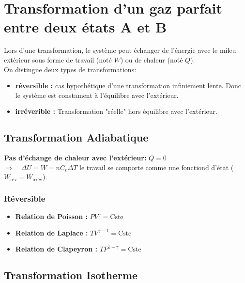 \documentclass[a4paper,12pt]{article}
\newcommand{\re}{\textrm}
\newcommand{\Cv}{\overline{C}_v} %
\begin{document}
\clearpage

\section{Transformation d'un gaz parfait entre deux états A et B}

    Lors d'une transformation, le système peut échanger de l'énergie avec le mileu extérieur
    sous forme de travail (noté $W$) ou de chaleur (noté $Q$).\\
    On distingue deux types de transformations:
    \begin{itemize}
        \item \textbf{réversible :} cas hypothétique d'une transformation infiniement lente. Donc le système est constament à l'équilibre avec l'extérieur.
        \item \textbf{irréverible :} Transformation "réelle" hors équilibre avec l'extérieur.
    \end{itemize}


    \subsection{Transformation Adiabatique}

        \textbf{Pas d'échange de chaleur avec l'extérieur:} $\boxed{Q = 0}$\\ 
        $ \Longrightarrow \quad \Delta U = W = n\Cv\Delta T $ \quad le travail se comporte comme une fonctiond d'état ($W_{\text{rév}} = W_{\text{irrév}}$).

        \subsubsection{Réversible}

            \begin{itemize}[label=\textbullet]
                \item \textbf{Relation de Poisson :} $PV^\gamma = \re{Cste}$
                \item \textbf{Relation de Laplace :} $T V^{\gamma - 1} = \re{Cste}$
                \item \textbf{Relation de Clapeyron :} $T P^{1 - \gamma} = \re{Cste}$
            \end{itemize}

    \subsection{Transformation Isotherme}
\end{document}
